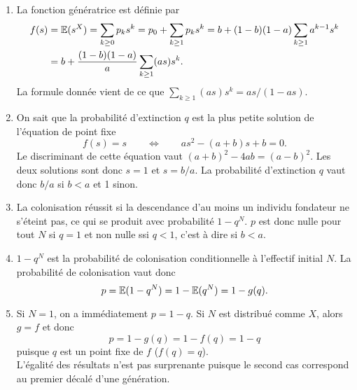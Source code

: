 \begin{enumerate}
  \item La fonction génératrice est définie par 
  \begin{align*}
    f(s) 
    & = \operatorname{\mathbb{E}}(s^X) = \sum_{k \geq 0} p_k s^k
    = p_0 + \sum_{k \geq 1} p_k s^k
    = b + (1 - b) (1 - a) \sum_{k \geq 1} a^{k-1} s^k \\
    & = b + \frac{(1 - b) (1 - a)}a \sum_{k \geq 1} (as) s^k .
  \end{align*}
  La formule donnée vient de ce que $\sum_{k \geq 1} (as) s^k = as / (1 - as)$. 
  \item On sait que la probabilité d'extinction $q$ est la plus petite solution de l'équation de point fixe
  $$
  f(s) = s
  \qquad \Leftrightarrow \qquad
  a s^2 - (a+b) s + b = 0.
  $$
  Le discriminant de cette équation vaut $(a+b)^2 - 4ab = (a-b)^2$. Les deux solutions sont
  donc $s = 1$ et $s = b/a$. La probabilité d'extinction $q$ vaut donc $b/a$ si $b < a$ et 1 sinon.
  \item La colonisation réussit si la descendance d'au moins un individu fondateur ne s'éteint pas, ce qui se produit avec probabilité $1 - q^N$. $p$ est donc nulle pour tout $N$ si $q = 1$ et non nulle ssi $q < 1$, c'est à dire si $b < a$.
  \item $1 - q^N$ est la probabilité de colonisation conditionnelle à l'effectif initial $N$. La probabilité de colonisation vaut donc
  $$
  p = \operatorname{\mathbb{E}}(1 - q^N) = 1 - \operatorname{\mathbb{E}}(q^N) = 1 - g(q).
  $$
  \item Si $N = 1$, on a immédiatement $p = 1 - q$. Si $N$ est distribué comme $X$, alors $g = f$ et donc
  $$
  p = 1 - g(q) = 1 - f(q) = 1 - q
  $$
  puisque $q$ est un point fixe de $f$ ($f(q) = q$). \\
  L'égalité des résultats n'est pas surprenante puisque le second cas correspond au premier décalé d'une génération.
\end{enumerate}


